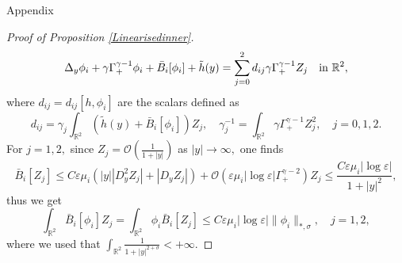 \documentclass[11pt,reqno,a4paper]{amsart}
\numberwithin{equation}{section}
\newcommand{\R}{\mathbb{R}}
\newcommand{\inn}{{\quad\hbox{in } }}
\newcommand{\ve}{\varepsilon}
\begin{document}
\begin{section}{Appendix}
\begin{proof}[Proof of Proposition \ref{Linearisedinner}]
\begin{equation}\label{001} 
\Delta_y\phi_{i}  +  \gamma\Gamma^{\gamma-1}_{+}\phi_{i}  + \bar{B}_i[\phi_{i}]  + \tilde{h}(y)  = \sum_{j=0}^2  d_{ij}\gamma\Gamma^{\gamma-1}_{+} Z_j \inn \R^2,
\end{equation}
where $d_{ij} = d_{ij}[h,\phi_{i}]$ are the scalars defined as
\begin{equation}\label{coeffsforortho}
d_{ij}= \gamma_j \int_{\R^2} (\tilde{h}(y)+\bar{B}_i[\phi_{i}] )Z_j,  \quad \gamma_j^{-1} = \int_{\R^2}  \gamma\Gamma^{\gamma-1}_{+} Z_j^2, \quad j=0,1,2.
\end{equation}
For $j=1,2,$ since $Z_j=\mathcal{O}\left(\frac{1}{1+|y|}\right)$ as $|y| \to \infty,$ one finds 
\[\bar{B}_i[Z_j]\leq C\ve\mu_i\left(|y||D^2_{y}Z_j|+|D_y Z_j|\right) +\mathcal{O}\left(\ve\mu_i|\log\ve| \Gamma^{\gamma-2}_{+}\right)Z_j  \leq \frac{C\ve\mu_i|\log\ve|}{1+|y|^2},\]
thus we get
 $$
  \int_{\R^2} \bar{B}_i[\phi_{i}]Z_j =   \int_{\R^2} \phi_{i} \bar{B}_i[Z_j] \leq C\ve\mu_i|\log\ve|\|\phi_{i}\|_{*,\sigma},\quad j=1,2,
 $$
 where we used that $ \int_{\R^2} \frac {1}{1+|y|^{2+\sigma}}  <+\infty$.
 

\end{proof}
\end{section}
\end{document}

